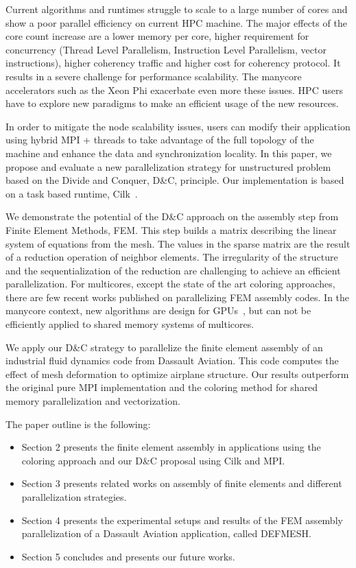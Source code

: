 \documentclass{IOS-Book-Article}
\begin{document}
Current algorithms and runtimes struggle to scale to a large number of cores and show a poor parallel efficiency on current HPC machine. 
The major effects of the core count increase are a lower memory per core, higher requirement for concurrency (Thread Level Parallelism, Instruction Level Parallelism, vector instructions),
higher coherency traffic and higher cost for coherency protocol.
It results in a severe challenge for performance scalability. The manycore accelerators such as the Xeon Phi exacerbate even more these issues.
HPC users have to explore new paradigms to make an efficient usage of the new resources. 

In order to mitigate the node scalability issues, users can modify their application using hybrid MPI + threads to take advantage of the full topology of the machine
and enhance the data and synchronization locality.
In this paper, we propose and evaluate a new parallelization strategy for unstructured problem based on the Divide and Conquer, D\&C, principle. Our implementation is based on a task based runtime,
Cilk~\cite{cilk5}. 

We demonstrate the potential of the D\&C approach on the assembly step from Finite Element Methods, FEM.
This step builds a matrix describing the linear system of equations from the mesh.
The values in the sparse matrix are the result of a reduction operation of neighbor elements.
The irregularity of the structure and the sequentialization of the reduction are challenging to achieve an efficient parallelization.
For multicores, except the state of the art coloring approaches, there are few recent works published on parallelizing FEM assembly codes.
In the manycore context, new algorithms are design for GPUs~\cite{cecka2011assembly,CPUGPUasm}, but can not be efficiently applied to shared memory systems of multicores.

We apply our D\&C strategy to parallelize the finite element assembly of an industrial fluid dynamics code from Dassault Aviation.
This code computes the effect of mesh deformation to optimize airplane structure.
Our results outperform the original pure MPI implementation and the coloring method for shared memory parallelization and vectorization.

The paper outline is the following:
\begin{itemize}
\item Section 2 presents the finite element assembly in applications using the coloring approach and our D\&C proposal using Cilk and MPI.
\item Section 3 presents related works on assembly of finite elements and different parallelization strategies.
\item Section 4 presents the experimental setups and results of the FEM assembly parallelization of a Dassault Aviation application, called DEFMESH.
\item Section 5 concludes and presents our future works.
\end{itemize}
\end{document}
